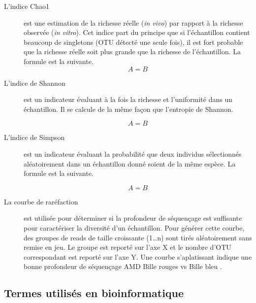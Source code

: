\documentclass[12pt,a4paper]{article}
\begin{document}
\begin{description}
\item[L'indice Chao1] est une estimation de la richesse réelle (\textit{in vivo}) par rapport à la richesse observée (\textit{in vitro}). Cet indice part du principe que si l’échantillon contient beaucoup de singletons (OTU détecté une seule fois), il est fort probable que la richesse réelle soit plus grande que la richesse de l’échantillon. La formule est la suivante.
\begin{equation}
A = B
\end{equation}

\item[L'indice de Shannon] est un indicateur évaluant à la fois la richesse et l’uniformité dans un échantillon. Il se calcule de la même façon que l’entropie de Shannon.

\begin{equation}
A = B
\end{equation}

\item[L'indice de Simpson] est un indicateur évaluant la probabilité que deux individus sélectionnés aléatoirement dans un échantillon donné soient de la même espèce. La formule est la suivante.

\begin{equation}
A = B
\end{equation}


\item[La courbe de raréfaction] est utilisée pour déterminer si la profondeur de séquençage est suffisante pour caractériser la diversité d’un échantillon.
Pour générer cette courbe, des groupes de reads de taille croissante (1…n) sont tirés aléatoirement sans remise en jeu. Le groupe est reporté sur l'axe X et le nombre d’OTU correspondant est reporté sur l’axe Y.
Une courbe s’aplatissant indique une bonne profondeur de séquençage \citep{Dickson2014} AMD \citep{Beck}
Bille rouges vs Bille bleu . 
\end{description}


\subsection{Termes utilisés en bioinformatique}
\end{document}
